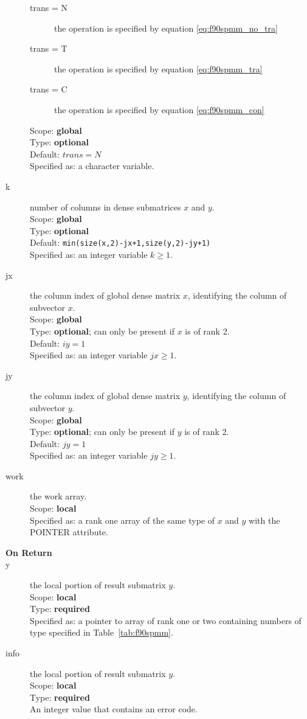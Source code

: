 \begin{description}
\begin{description}
\item[trans = N] the operation is specified by equation \ref{eq:f90spmm_no_tra}
\item[trans = T] the operation is specified by equation
\ref{eq:f90spmm_tra}
\item[trans = C] the operation is specified by equation
\ref{eq:f90spmm_con}
\end{description}
Scope: {\bf global} \\
Type: {\bf optional}\\	
Default: $trans = N$\\	
Specified as: a character variable.
\item[k] number of columns in dense submatrices $x$ and $y$. \\
Scope: {\bf global} \\
Type: {\bf optional}\\	
Default: \verb|min(size(x,2)-jx+1,size(y,2)-jy+1)|\\	
Specified as: an integer variable $ k \ge 1$.
\item[jx]  the column index of global dense matrix $x$,
identifying the column of subvector $x$.\\
Scope: {\bf global} \\
Type: {\bf optional}; can only be present if $x$ is of rank 2.\\	
Default: $iy = 1$\\	
Specified as: an integer variable $jx\ge 1$. 
\item[jy]  the column index of global dense matrix $y$,
identifying the column of subvector $y$.\\
Scope: {\bf global} \\
Type: {\bf optional}; can only be present if $y$ is of rank 2.\\	
Default: $jy = 1$\\	
Specified as: an integer variable $jy\ge 1$. 

\item[work] the work array.\\
Scope: {\bf local} \\
Specified as: a rank one array of the same type of $x$ and $y$ with
the POINTER attribute. 

\item[\bf On Return]
\item[y] the local portion of result submatrix $y$.\\
Scope: {\bf local} \\
Type: {\bf required} \\
Specified as: a pointer to array of rank one or two
containing numbers of type specified in
Table~\ref{tab:f90spmm}.
\item[info] the local portion of result submatrix $y$.\\
Scope: {\bf local} \\
Type: {\bf required} \\
An integer value that contains an error code. 
\end{description}

